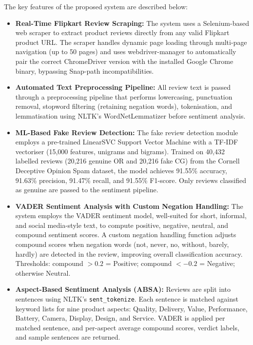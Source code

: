 \documentclass[12pt,a4paper]{report}
\begin{document}
The key features of the proposed system are described below:

\begin{itemize}
  \item \textbf{Real-Time Flipkart Review Scraping:} The system uses a Selenium-based web scraper to extract product reviews directly from any valid Flipkart product URL. The scraper handles dynamic page loading through multi-page navigation (up to 50 pages) and uses webdriver-manager to automatically pair the correct ChromeDriver version with the installed Google Chrome binary, bypassing Snap-path incompatibilities.

  \item \textbf{Automated Text Preprocessing Pipeline:} All review text is passed through a preprocessing pipeline that performs lowercasing, punctuation removal, stopword filtering (retaining negation words), tokenisation, and lemmatisation using NLTK's WordNetLemmatizer before sentiment analysis.

  \item \textbf{ML-Based Fake Review Detection:} The fake review detection module employs a pre-trained LinearSVC Support Vector Machine with a TF-IDF vectoriser (15,000 features, unigrams and bigrams). Trained on 40,432 labelled reviews (20,216 genuine OR and 20,216 fake CG) from the Cornell Deceptive Opinion Spam dataset, the model achieves 91.55\% accuracy, 91.63\% precision, 91.47\% recall, and 91.55\% F1-score. Only reviews classified as genuine are passed to the sentiment pipeline.

  \item \textbf{VADER Sentiment Analysis with Custom Negation Handling:} The system employs the VADER sentiment model, well-suited for short, informal, and social media-style text, to compute positive, negative, neutral, and compound sentiment scores. A custom negation handling function adjusts compound scores when negation words (not, never, no, without, barely, hardly) are detected in the review, improving overall classification accuracy. Thresholds: compound $> 0.2$ = Positive; compound $< -0.2$ = Negative; otherwise Neutral.

  \item \textbf{Aspect-Based Sentiment Analysis (ABSA):} Reviews are split into sentences using NLTK's \texttt{sent\_tokenize}. Each sentence is matched against keyword lists for nine product aspects: Quality, Delivery, Value, Performance, Battery, Camera, Display, Design, and Service. VADER is applied per matched sentence, and per-aspect average compound scores, verdict labels, and sample sentences are returned.


\end{itemize}
\end{document}
